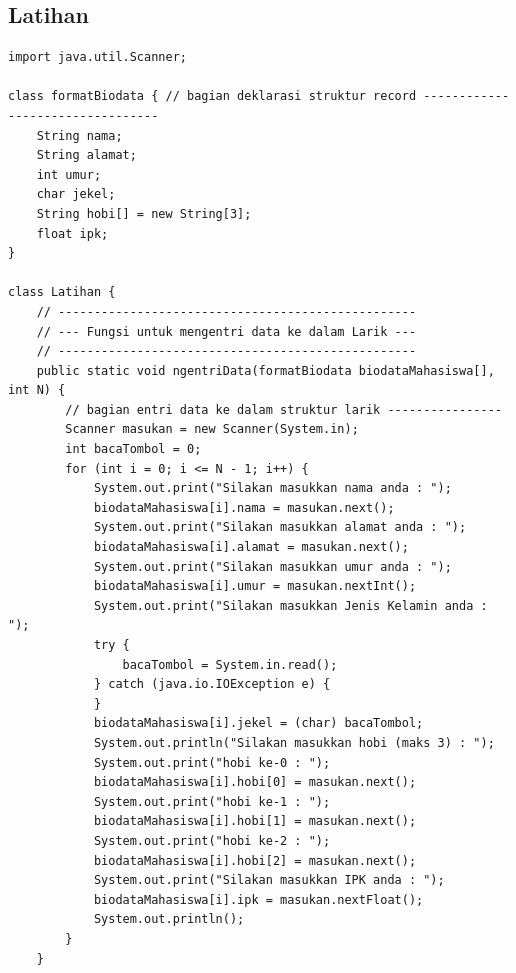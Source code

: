 \documentclass[a4paper,12pt]{article}
\begin{document}
\subsection{Latihan}
\begin{lstlisting}
import java.util.Scanner;

class formatBiodata { // bagian deklarasi struktur record ---------------------------------
    String nama;
    String alamat;
    int umur;
    char jekel;
    String hobi[] = new String[3];
    float ipk;
}

class Latihan {
    // --------------------------------------------------
    // --- Fungsi untuk mengentri data ke dalam Larik ---
    // --------------------------------------------------
    public static void ngentriData(formatBiodata biodataMahasiswa[], int N) {
        // bagian entri data ke dalam struktur larik ----------------
        Scanner masukan = new Scanner(System.in);
        int bacaTombol = 0;
        for (int i = 0; i <= N - 1; i++) {
            System.out.print("Silakan masukkan nama anda : ");
            biodataMahasiswa[i].nama = masukan.next();
            System.out.print("Silakan masukkan alamat anda : ");
            biodataMahasiswa[i].alamat = masukan.next();
            System.out.print("Silakan masukkan umur anda : ");
            biodataMahasiswa[i].umur = masukan.nextInt();
            System.out.print("Silakan masukkan Jenis Kelamin anda : ");
            try {
                bacaTombol = System.in.read();
            } catch (java.io.IOException e) {
            }
            biodataMahasiswa[i].jekel = (char) bacaTombol;
            System.out.println("Silakan masukkan hobi (maks 3) : ");
            System.out.print("hobi ke-0 : ");
            biodataMahasiswa[i].hobi[0] = masukan.next();
            System.out.print("hobi ke-1 : ");
            biodataMahasiswa[i].hobi[1] = masukan.next();
            System.out.print("hobi ke-2 : ");
            biodataMahasiswa[i].hobi[2] = masukan.next();
            System.out.print("Silakan masukkan IPK anda : ");
            biodataMahasiswa[i].ipk = masukan.nextFloat();
            System.out.println();
        }
    }


\end{lstlisting}
\end{document}
